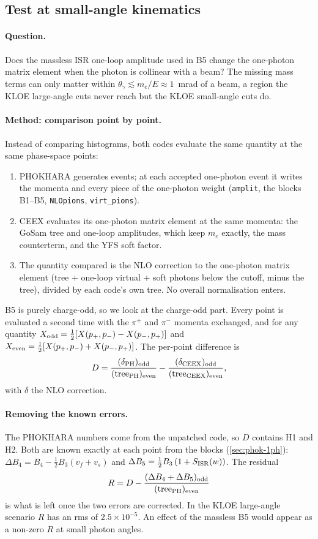 \documentclass[11pt,a4paper]{article}
\newcommand{\code}[1]{\texttt{#1}}
\newcommand{\phok}{PHOKHARA}
\newcommand{\ceex}{CEEX}
\newcommand{\gosam}{GoSam}
\begin{document}
\subsection*{Test at small-angle kinematics}

\paragraph{Question.} Does the massless ISR one-loop amplitude used in B5 change the one-photon
matrix element when the photon is collinear with a beam? The missing mass terms can only matter
within $\theta_\gamma\lesssim m_e/E\approx1$~mrad of a beam, a region the KLOE large-angle cuts
never reach but the KLOE small-angle cuts do.

\paragraph{Method: comparison point by point.} Instead of comparing histograms, both codes
evaluate the same quantity at the same phase-space points:
\begin{enumerate}[leftmargin=*]
\item \phok{} generates events; at each accepted one-photon event it writes the momenta and every
  piece of the one-photon weight (\code{amplit}, the blocks B1--B5, \code{NLOpions},
  \code{virt\_pions}).
\item \ceex{} evaluates its one-photon matrix element at the same momenta: the \gosam{} tree and
  one-loop amplitudes, which keep $m_e$ exactly, the mass counterterm, and the YFS soft factor.
\item The quantity compared is the NLO correction to the one-photon matrix element (tree +
  one-loop virtual + soft photons below the cutoff, minus the tree), divided by each code's own
  tree. No overall normalisation enters.
\end{enumerate}
B5 is purely charge-odd, so we look at the charge-odd part. Every point is evaluated a second
time with the $\pi^+$ and $\pi^-$ momenta exchanged, and for any quantity
$X_{\rm odd}=\tfrac12[X(p_+,p_-)-X(p_-,p_+)]$ and $X_{\rm even}=\tfrac12[X(p_+,p_-)+X(p_-,p_+)]$.
The per-point difference is
\[
  D=\frac{(\delta_{\rm PH})_{\rm odd}}{({\rm tree}_{\rm PH})_{\rm even}}
   -\frac{(\delta_{\rm CEEX})_{\rm odd}}{({\rm tree}_{\rm CEEX})_{\rm even}},
\]
with $\delta$ the NLO correction.

\paragraph{Removing the known errors.} The \phok{} numbers come from the unpatched code, so $D$
contains H1 and H2. Both are known exactly at each point from the blocks
(\cref{sec:phok-1ph}): $\Delta B_4=B_4-\tfrac12B_3(v_f+v_s)$ and
$\Delta B_5=\tfrac12B_3\,(1+S_{\rm ISR}(w))$. The residual
\[
  R=D-\frac{(\Delta B_4+\Delta B_5)_{\rm odd}}{({\rm tree}_{\rm PH})_{\rm even}}
\]
is what is left once the two errors are corrected. In the KLOE large-angle scenario $R$ has an
rms of $2.5\times10^{-5}$. An effect of the massless B5 would appear as a non-zero $R$ at small
photon angles.
\end{document}
